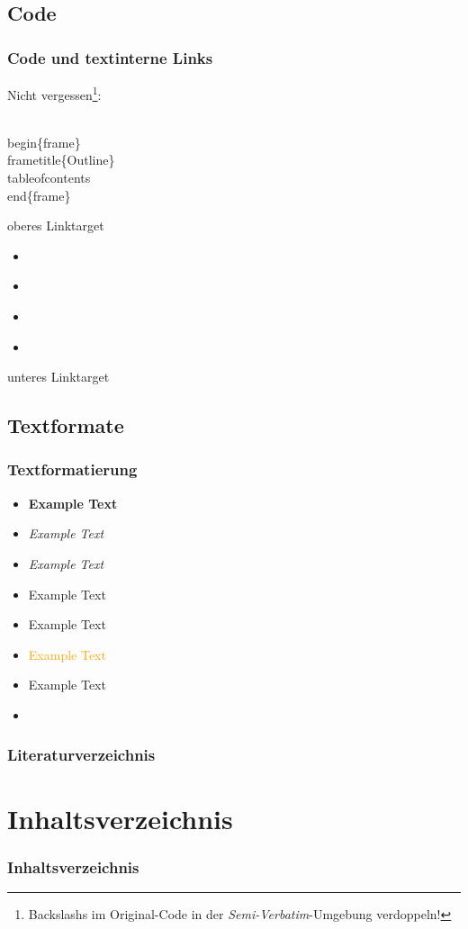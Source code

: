 \documentclass[]{beamer}
\begin{document}
\subsection{Code}
\begin{frame}[fragile]
  \frametitle{Code und textinterne Links}
  Nicht vergessen\footnote{Backslashs im Original-Code in der \textit{Semi-Verbatim}-Umgebung verdoppeln!}:
  \begin{semiverbatim}
    \\begin\{frame\}
    \\frametitle\{Outline\}
    \\tableofcontents
    \\end\{frame\}
  \end{semiverbatim}

  oberes Linktarget  
  \label{oben}
  \begin{itemize}
    \item \hyperlink{oben}{}
    \item \hyperlink{unten}{}
    \item \hyperlink{oben}{}
    \item \hyperlink{unten}{}
  \end{itemize}
  unteres Linktarget  
  \label{unten}

\end{frame}

\subsection{Textformate}
\begin{frame}
  \frametitle{Textformatierung}
  \begin{itemize}
    \item \textbf{Example Text}
    \item \textit{Example Text}
    \item \textsl{Example Text}
    \item \textrm{Example Text}
    \item \textsf{Example Text}
    \item \textcolor{orange}{Example Text}
    \item \alert{Example Text}
    \item {}
  \end{itemize}
\end{frame}



\begin{frame}
  \frametitle{Literaturverzeichnis}
  
  \printbibliography
  
\end{frame}

\section{Inhaltsverzeichnis}

  \begin{frame}
    \frametitle{Inhaltsverzeichnis}
    \tableofcontents
  \end{frame}
\end{document}
